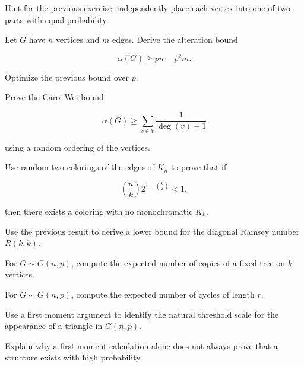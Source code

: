 \begin{exercise}[3]
Hint for the previous exercise: independently place each vertex into
one of two parts with equal probability.
\end{exercise}

\begin{exercise}[3]
Let \(G\) have \(n\) vertices and \(m\) edges. Derive the alteration
bound

\[
\alpha(G)
\geq
pn-p^2m.
\]
\end{exercise}

\begin{exercise}[3]
Optimize the previous bound over \(p\).
\end{exercise}

\begin{exercise}[3]
Prove the Caro--Wei bound

\[
\alpha(G)
\geq
\sum_{v\in V}
\frac{1}{\deg(v)+1}
\]

using a random ordering of the vertices.
\end{exercise}

\begin{exercise}[3]
Use random two-colorings of the edges of \(K_n\) to prove that if

\[
\binom nk
2^{1-\binom{k}{2}}
<1,
\]

then there exists a coloring with no monochromatic \(K_k\).
\end{exercise}

\begin{exercise}[3]
Use the previous result to derive a lower bound for the diagonal Ramsey
number \(R(k,k)\).
\end{exercise}

\begin{exercise}[3]
For \(G\sim G(n,p)\), compute the expected number of copies of a fixed
tree on \(k\) vertices.
\end{exercise}

\begin{exercise}[3]
For \(G\sim G(n,p)\), compute the expected number of cycles of length
\(r\).
\end{exercise}

\begin{exercise}[3]
Use a first moment argument to identify the natural threshold scale for
the appearance of a triangle in \(G(n,p)\).
\end{exercise}

\begin{exercise}[3]
Explain why a first moment calculation alone does not always prove that
a structure exists with high probability.
\end{exercise}

